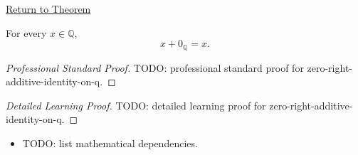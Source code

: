 \newpage
{}
\label{prf:zero-right-additive-identity-on-q}

\begin{remark*}[Return]
\hyperref[cor:zero-right-additive-identity-on-q]{Return to Theorem}
\end{remark*}

\begin{corollary*}
For every $x\in\mathbb{Q}$,
\[
x+0_{\mathbb{Q}}=x.
\]
\end{corollary*}

\begin{proof}[Professional Standard Proof]
\LRAProofBodyStart
TODO: professional standard proof for zero-right-additive-identity-on-q.
\end{proof}

\begin{proof}[Detailed Learning Proof]
\LRAProofBodyStart
TODO: detailed learning proof for zero-right-additive-identity-on-q.
\end{proof}

\begin{remark*}
\end{remark*}

\begin{dependencies}
\begin{itemize}
  \item TODO: list mathematical dependencies.
\end{itemize}
\end{dependencies}

\clearpage
